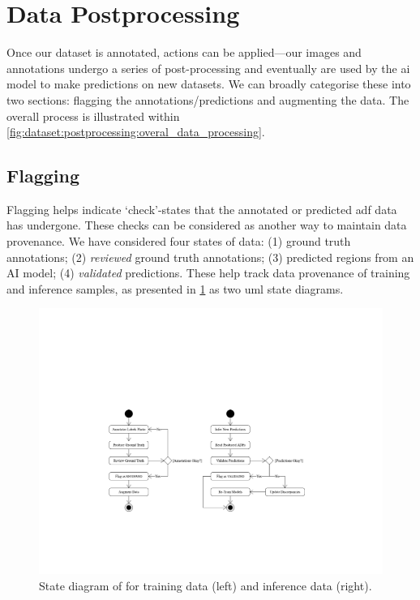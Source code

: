 \section{Data Postprocessing}
\label{sec:dataset:postprocessing}

Once our dataset is annotated, actions can be applied---our images and annotations undergo a series of post-processing and eventually are used by the \gls{ai} model to make predictions on new datasets. We can broadly categorise these into two sections: flagging the annotations/predictions and augmenting the data. The overall process is illustrated within \cref{fig:dataset:postprocessing:overal_data_processing}.

\subsection{Flagging}
\label{sec:dataset:postprocessing:flagging}

Flagging helps indicate `check'-states that the annotated or predicted \gls{adf} data has undergone. These checks can be considered as another way to maintain data provenance. We have considered four states of data: (1) ground truth annotations; (2) \textit{reviewed} ground truth annotations; (3) predicted regions from an AI model; (4) \textit{validated} predictions. These help track data provenance of training and inference samples, as presented in \cref{fig:dataset:postprocessing:state_diagram_flagging} as two \gls{uml} state diagrams.

\begin{figure}[h]
  \centering
  \includegraphics[width=\textwidth]{images/dataset/flagging_statemodel}
  \caption[State diagram to represent flagging]{State diagram of for training data (left) and inference data (right).}
  \label{fig:dataset:postprocessing:state_diagram_flagging}
\end{figure}

